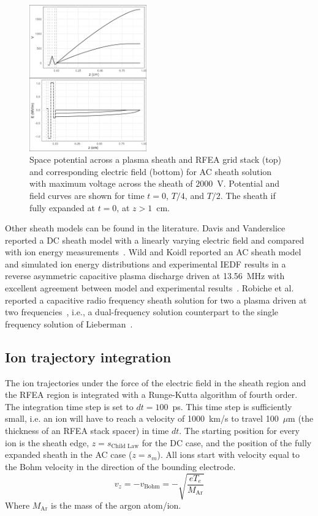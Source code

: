 \begin{figure}[htbp]
\centering
\includegraphics[width=0.45\textwidth]{Figures/VEz0.5Pa13.56MHz2kVStack2332.jpeg}
\caption{Space potential across a plasma sheath and RFEA grid stack (top) and corresponding electric field (bottom) for AC sheath solution with maximum voltage across the sheath of $2000$~V. Potential and field curves are shown for time $t=0$, $T/4$, and $T/2$. The sheath if fully expanded at $t=0$, at $z>1$~cm.}
\label{fig:ACpotentialField}
\end{figure}


Other sheath models can be found in the literature. Davis and Vanderslice reported a DC sheath model with a linearly varying electric field and compared with ion energy measurements~\cite{Davis1963}. Wild and Koidl reported an AC sheath model and simulated ion energy distributions and experimental IEDF results in a reverse asymmetric capacitive plasma discharge driven at 13.56~MHz with excellent agreement between model and experimental results~\cite{Wild1991}. Robiche et al. reported a capacitive radio frequency sheath solution for two a plasma driven at two frequencies~\cite{Robiche2003}, i.e., a dual-frequency solution counterpart to the single frequency solution of Lieberman~\cite{Lieberman1988}.   







\subsection{\label{IonTrajectory}Ion trajectory integration}
The ion trajectories under the force of the electric field in the sheath region and the RFEA region is integrated with a Runge-Kutta algorithm of fourth order. The integration time step is set to $dt=100$~ps. This time step is sufficiently small, i.e. an ion will have to reach a velocity of 1000~km/s to travel 100~$\mu$m (the thickness of an RFEA stack spacer) in time $dt$. The starting position for every ion is the sheath edge, $z=s_\text{Child Law}$ for the DC case, and the position of the fully expanded sheath in the AC case ($z=s_m$). All ions start with velocity equal to the Bohm velocity in the direction of the bounding electrode.
\begin{equation}
v_z = - v_\text{Bohm} = -\sqrt{\frac{e T_e}{M_\text{Ar}}}
\end{equation}
Where $M_\text{Ar}$ is the mass of the argon atom/ion. 

